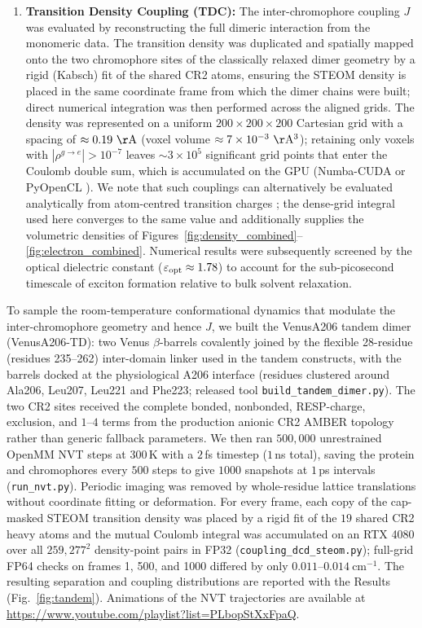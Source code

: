 \documentclass[journal=jpcbfk, manuscript=article, layout=twocolumn, doi=true]{achemso}
\begin{document}
\begin{enumerate}
    \item \textbf{Transition Density Coupling (TDC):} The inter-chromophore coupling $J$ was evaluated by reconstructing the full dimeric interaction from the monomeric data. The transition density was duplicated and spatially mapped onto the two chromophore sites of the classically relaxed dimer geometry by a rigid (Kabsch) fit of the shared CR2 atoms, ensuring the STEOM density is placed in the same coordinate frame from which the dimer chains were built; direct numerical integration was then performed across the aligned grids. The density was represented on a uniform $200\times200\times200$ Cartesian grid with a spacing of $\approx 0.19~\mathrm{\AA}$ (voxel volume $\approx 7\times10^{-3}~\mathrm{\AA^3}$); retaining only voxels with $|\rho^{g\to e}| > 10^{-7}$ leaves $\sim 3\times10^{5}$ significant grid points that enter the Coulomb double sum, which is accumulated on the GPU (Numba-CUDA or PyOpenCL \cite{lam2015numba,klockner2012pycuda}). We note that such couplings can alternatively be evaluated analytically from atom-centred transition charges \cite{hsu2009}; the dense-grid integral used here converges to the same value and additionally supplies the volumetric densities of Figures~\ref{fig:density_combined}--\ref{fig:electron_combined}. Numerical results were subsequently screened by the optical dielectric constant ($\varepsilon_{\rm opt} \approx 1.78$) to account for the sub-picosecond timescale of exciton formation relative to bulk solvent relaxation.
\end{enumerate}

{To sample the room-temperature conformational dynamics that modulate the inter-chromophore geometry and hence $J$, we built the VenusA206 tandem dimer (VenusA206-TD): two Venus $\beta$-barrels covalently joined by the flexible 28-residue (residues 235--262) inter-domain linker used in the tandem constructs, with the barrels docked at the physiological A206 interface (residues clustered around Ala206, Leu207, Leu221 and Phe223; released tool \texttt{build\_\allowbreak tandem\_\allowbreak dimer.py}). The two CR2 sites received the complete bonded, nonbonded, RESP-charge, exclusion, and $1$--$4$ terms from the production anionic CR2 AMBER topology rather than generic fallback parameters. We then ran $500{,}000$ unrestrained OpenMM NVT steps at $300$\,K with a $2$\,fs timestep ($1$\,ns total), saving the protein and chromophores every $500$ steps to give $1000$ snapshots at $1$\,ps intervals (\texttt{run\_nvt.py}). Periodic imaging was removed by whole-residue lattice translations without coordinate fitting or deformation. For every frame, each copy of the cap-masked STEOM transition density was placed by a rigid fit of the $19$ shared CR2 heavy atoms and the mutual Coulomb integral was accumulated on an RTX 4080 over all $259{,}277^2$ density-point pairs in FP32 (\texttt{coupling\_dcd\_steom.py}); full-grid FP64 checks on frames 1, 500, and 1000 differed by only $0.011$--$0.014~\mathrm{cm^{-1}}$. The resulting separation and coupling distributions are reported with the Results (Fig.~\ref{fig:tandem}). Animations of the NVT trajectories are available at \url{https://www.youtube.com/playlist?list=PLbopStXxFpaQ}.}
\end{document}
